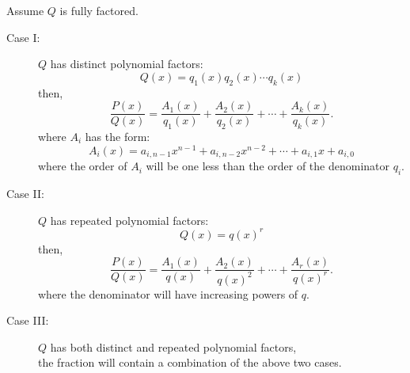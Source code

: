 \documentclass{article}
\begin{document}
Assume \(Q\) is fully factored.
\begin{description}
    \item[Case I:] \(Q\) has distinct polynomial factors:
        \begin{equation*}
            Q\left( x \right) = q_1\left( x \right) q_2\left( x \right) \cdots q_k\left( x \right)
        \end{equation*}
        then,
        \begin{equation*}
            \frac{P\left( x \right)}{Q\left( x \right)} = \frac{A_1\left( x \right)}{q_1\left( x \right)} + \frac{A_2\left( x \right)}{q_2\left( x \right)} + \cdots + \frac{A_k\left( x \right)}{q_k\left( x \right)}.
        \end{equation*}
        where \(A_i\) has the form:
        \begin{equation*}
            A_i\left( x \right) = a_{i,n-1} x^{n - 1} + a_{i,n-2} x^{n - 2} + \cdots + a_{i,1} x + a_{i,0}
        \end{equation*}
        where the order of \(A_i\) will be one less than the order of the denominator \(q_i\).
    \item[Case II:] \(Q\) has repeated polynomial factors:
        \begin{equation*}
            Q\left( x \right) = q\left( x \right)^r
        \end{equation*}
        then,
        \begin{equation*}
            \frac{P\left( x \right)}{Q\left( x \right)} = \frac{A_1\left( x \right)}{q\left( x \right)} + \frac{A_2\left( x \right)}{q\left( x \right)^2} + \cdots + \frac{A_r\left( x \right)}{q\left( x \right)^r}.
        \end{equation*}
        where the denominator will have increasing powers of \(q\).
    \item[Case III:] \(Q\) has both distinct and repeated polynomial factors,\\
        the fraction will contain a combination of the above two cases.
\end{description}
\end{document}
